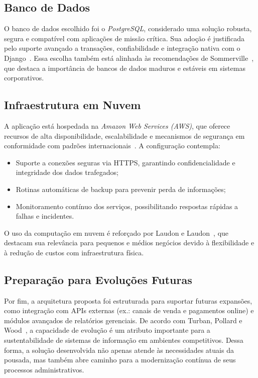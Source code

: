 \documentclass[
	12pt,				%
	openany,			%
	oneside,			%
	a4paper,			%
	english,			%
	french,				%
	spanish,			%
	brazil				%
	]{abntex2}
\begin{document}
\subsection{Banco de Dados}

O banco de dados escolhido foi o \textit{PostgreSQL}, considerado uma solução robusta, segura e compatível com aplicações de missão crítica. Sua adoção é justificada pelo suporte avançado a transações, confiabilidade e integração nativa com o Django~\cite{postgresql}. Essa escolha também está alinhada às recomendações de Sommerville~\cite{sommerville}, que destaca a importância de bancos de dados maduros e estáveis em sistemas corporativos.

\subsection{Infraestrutura em Nuvem}

A aplicação está hospedada na \textit{Amazon Web Services (AWS)}, que oferece recursos de alta disponibilidade, escalabilidade e mecanismos de segurança em conformidade com padrões internacionais~\cite{aws-doc}. A configuração contempla:
\begin{itemize}
	\item Suporte a conexões seguras via HTTPS, garantindo confidencialidade e integridade dos dados trafegados;
	\item Rotinas automáticas de backup para prevenir perda de informações;
	\item Monitoramento contínuo dos serviços, possibilitando respostas rápidas a falhas e incidentes.
\end{itemize}

O uso da computação em nuvem é reforçado por Laudon e Laudon~\cite{laudon2020sistemas}, que destacam sua relevância para pequenos e médios negócios devido à flexibilidade e à redução de custos com infraestrutura física.

\subsection{Preparação para Evoluções Futuras}

Por fim, a arquitetura proposta foi estruturada para suportar futuras expansões, como integração com APIs externas (ex.: canais de venda e pagamentos online) e módulos avançados de relatórios gerenciais. De acordo com Turban, Pollard e Wood~\cite{turban2018sistemas}, a capacidade de evolução é um atributo importante para a sustentabilidade de sistemas de informação em ambientes competitivos. Dessa forma, a solução desenvolvida não apenas atende às necessidades atuais da pousada, mas também abre caminho para a modernização contínua de seus processos administrativos.
\end{document}
